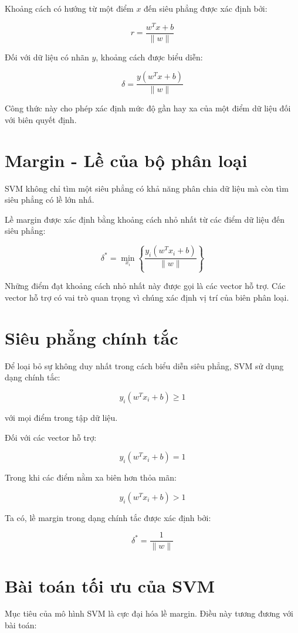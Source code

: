 \documentclass[12pt,a4paper]{report}
\begin{document}
Khoảng cách có hướng từ một điểm $x$ đến siêu phẳng được xác định bởi:

$$
r=\frac{w^Tx+b}{\|w\|}
$$

\noindent
Đối với dữ liệu có nhãn $y$, khoảng cách được biểu diễn:

$$
\delta=
\frac{y(w^Tx+b)}{\|w\|}
$$

Công thức này cho phép xác định mức độ gần hay xa của một điểm dữ liệu đối với biên quyết định.




\section{Margin - Lề của bộ phân loại}

	SVM không chỉ tìm một siêu phẳng có khả năng phân chia dữ liệu mà còn tìm	siêu phẳng có lề lớn nhấ.

Lề margin được xác định bằng khoảng cách nhỏ nhất từ các điểm dữ liệu đến siêu phẳng:

$$
\delta^*
=
\min_{x_i}
\left\{
\frac{y_i(w^Tx_i+b)}
{\|w\|}
\right\}
$$

Những điểm đạt khoảng cách nhỏ nhất này được gọi là
các vector hỗ trợ. Các vector hỗ trợ có vai trò quan trọng vì chúng xác định vị trí của biên phân loại.

\section{Siêu phẳng chính tắc}

Để loại bỏ sự không duy nhất trong cách biểu diễn siêu phẳng, SVM sử dụng
dạng chính tắc:

$$
y_i(w^Tx_i+b)\geq1
$$

với mọi điểm trong tập dữ liệu.

\noindent
Đối với các vector hỗ trợ:

$$
y_i(w^Tx_i+b)=1
$$

\noindent
Trong khi các điểm nằm xa biên hơn thỏa mãn:

$$
y_i(w^Tx_i+b)>1
$$

Ta có, lề margin trong dạng chính tắc được xác định bởi:

$$
\delta^*=\frac{1}{\|w\|}
$$

\section{Bài toán tối ưu của SVM}

Mục tiêu của mô hình SVM là cực đại hóa lề margin. Điều này tương đương với bài toán:
\end{document}
